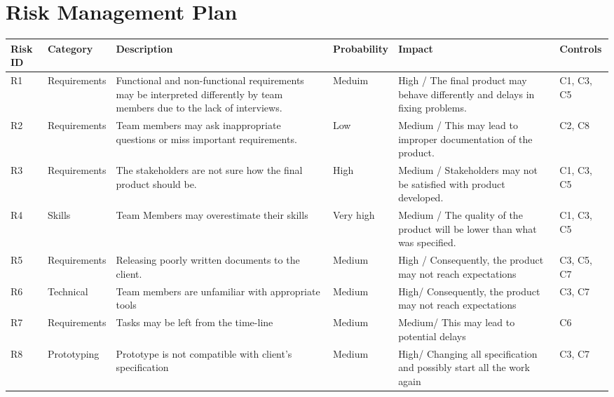\documentclass{l3deliverable}
\begin{document}
{%

\section{Risk Management Plan}

\begin{center}{
\begin{tabular}{|p{2cm}|p{2cm}|p{3cm}|p{2cm}|p{3cm}|p{2cm}|}
\hline \textbf{Risk ID} &\textbf{Category} & \textbf{Description} & \textbf{Probability} & \textbf{Impact} & \textbf{Controls}\\
\hline R1 & Requirements & Functional and non-functional requirements may be interpreted differently by team members due to the lack of interviews. & Meduim & High / The final product may behave differently and delays in fixing problems. & C1, C3, C5\\
\hline R2 & Requirements & Team members may ask inappropriate questions or miss important requirements. & Low & Medium / This may lead to improper documentation of the product. & C2, C8\\
\hline R3 & Requirements & The stakeholders are not sure how the final product should be. & High & Medium / Stakeholders may not be satisfied with product developed. & C1, C3, C5\\
\hline R4 & Skills & Team Members may overestimate their skills & Very high & Medium / The quality of the product will be lower than what was specified. & C1, C3, C5\\
\hline R5 & Requirements & Releasing poorly written documents to the client. & Medium & High / Consequently, the product may not reach expectations & C3, C5, C7\\
\hline R6 & Technical & Team members are unfamiliar with appropriate tools & Medium & High/ Consequently, the product may not reach expectations & C3, C7\\
\hline R7 & Requirements & Tasks may be left from the time-line & Medium & Medium/ This may lead to potential delays & C6\\
\hline R8 & Prototyping & Prototype is not compatible with client's specification & Medium & High/ Changing all specification and possibly start all the work again & C3, C7\\
\hline
\end{tabular} }
\end{center}

}
\end{document}
